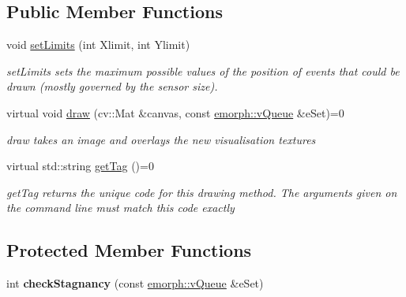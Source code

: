 \subsection*{Public Member Functions}
\begin{DoxyCompactItemize}
\item 
void \hyperlink{classemorph_1_1vDraw_a2f3fcaac36593cb22d7972a27e0f88fa}{set\-Limits} (int Xlimit, int Ylimit)
\begin{DoxyCompactList}\small\item\em set\-Limits sets the maximum possible values of the position of events that could be drawn (mostly governed by the sensor size). \end{DoxyCompactList}\item 
virtual void \hyperlink{classemorph_1_1vDraw_af10374185b2bd6f6e099325ec5815847}{draw} (cv\-::\-Mat \&canvas, const \hyperlink{classemorph_1_1vQueue}{emorph\-::v\-Queue} \&e\-Set)=0
\begin{DoxyCompactList}\small\item\em draw takes an image and overlays the new visualisation textures \end{DoxyCompactList}\item 
virtual std\-::string \hyperlink{classemorph_1_1vDraw_a3d238b29b58fb63ae3f7d258a199bb68}{get\-Tag} ()=0
\begin{DoxyCompactList}\small\item\em get\-Tag returns the unique code for this drawing method. The arguments given on the command line must match this code exactly \end{DoxyCompactList}\end{DoxyCompactItemize}
\subsection*{Protected Member Functions}
\begin{DoxyCompactItemize}
\item 
\hypertarget{classemorph_1_1vDraw_a2cadf813b464b80ec399a2a80e81451e}{int {\bfseries check\-Stagnancy} (const \hyperlink{classemorph_1_1vQueue}{emorph\-::v\-Queue} \&e\-Set)}\label{classemorph_1_1vDraw_a2cadf813b464b80ec399a2a80e81451e}

\end{DoxyCompactItemize}
